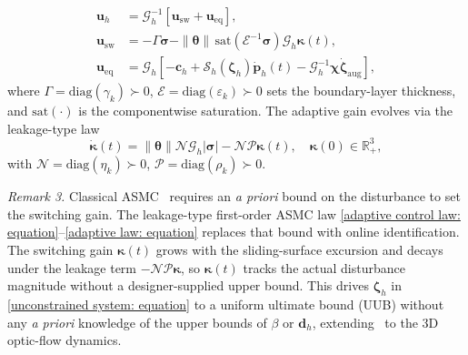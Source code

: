 \begin{align} \label{adaptive control law: equation}
    \boldsymbol{u}_h &= \mathcal{G}_h^{-1}[\boldsymbol{u}_\text{sw}+\boldsymbol{u}_\text{eq}],\nonumber\\
    \boldsymbol{u}_\text{sw} &= -\Gamma\boldsymbol{\sigma} - \|\boldsymbol{\theta}\|\,\text{sat}(\mathcal{E}^{-1}\boldsymbol{\sigma})\mathcal{G}_h\boldsymbol{\kappa}(t),\\
    \boldsymbol{u}_\text{eq} &= \mathcal{G}_h\!\left[-\boldsymbol{c}_h+\mathcal{S}_h(\boldsymbol{\zeta}_h)\dot{\boldsymbol{p}}_h(t)-\mathcal{G}_h^{-1}\boldsymbol{\chi}\dot{\boldsymbol{\zeta}}_\text{aug}\right],\nonumber
\end{align}
where $\Gamma=\text{diag}(\gamma_k)\succ 0$, $\mathcal{E}=\text{diag}(\varepsilon_k)\succ 0$ sets the boundary-layer thickness, and $\text{sat}(\cdot)$ is the componentwise saturation. The adaptive gain evolves via the leakage-type law
\begin{equation} \label{adaptive law: equation}
    \dot{\boldsymbol{\kappa}}(t) = \|\boldsymbol{\theta}\|\mathcal{N}\mathcal{G}_h|\boldsymbol{\sigma}| - \mathcal{N}\mathcal{P}\boldsymbol{\kappa}(t),\quad\boldsymbol{\kappa}(0)\in\mathbb{R}_+^3,
\end{equation}
with $\mathcal{N}=\text{diag}(\eta_k)\succ 0$, $\mathcal{P}=\text{diag}(\rho_k)\succ 0$.

\textit{Remark 3.} Classical ASMC~\cite{roy2020} requires an \emph{a priori} bound on the disturbance to set the switching gain. The leakage-type first-order ASMC law \eqref{adaptive control law: equation}--\eqref{adaptive law: equation} replaces that bound with online identification. The switching gain $\boldsymbol{\kappa}(t)$ grows with the sliding-surface excursion and decays under the leakage term $-\mathcal{N}\mathcal{P}\boldsymbol{\kappa}$, so $\boldsymbol{\kappa}(t)$ tracks the actual disturbance magnitude without a designer-supplied upper bound. This drives $\boldsymbol{\zeta}_h$ in \eqref{unconstrained system: equation} to a uniform ultimate bound (UUB) without any \emph{a priori} knowledge of the upper bounds of $\beta$ or $\boldsymbol{d}_h$, extending~\cite{singhal2025} to the 3D optic-flow dynamics.


